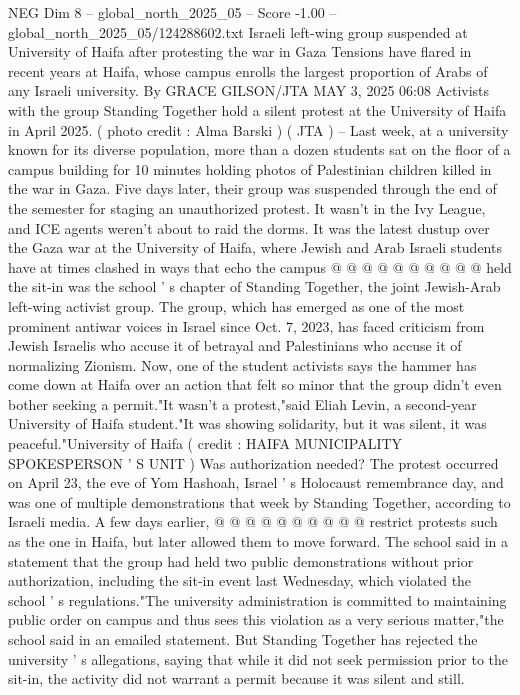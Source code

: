\begin{textsample}{NEG Dim 8 – global\_north\_2025\_05 – Score -1.00 – global\_north\_2025\_05/124288602.txt}  \label{ex:f8_neg_408}
Israeli left-wing group suspended at University of Haifa after protesting the war in Gaza Tensions have flared in recent years at Haifa, whose campus enrolls the largest proportion of Arabs of any Israeli university.
By GRACE GILSON/JTA MAY 3, 2025 06:08 Activists with the group Standing Together hold a silent protest at the University of Haifa in April 2025. ( photo credit : Alma Barski ) ( JTA ) -- Last week, at a university known for its diverse population, more than a dozen students sat on the floor of a campus building for 10 minutes holding photos of Palestinian children killed in the war in Gaza.
Five days later, their group was suspended through the end of the semester for staging an unauthorized protest.
It wasn't in the Ivy League, and ICE agents weren't about to raid the dorms.
It was the latest dustup over the Gaza war at the University of Haifa, where Jewish and Arab Israeli students have at times clashed in ways that echo the campus @ @ @ @ @ @ @ @ @ @ held the sit-in was the school ' s chapter of Standing Together, the joint Jewish-Arab left-wing activist group.
The group, which has emerged as one of the most prominent antiwar voices in Israel since Oct. 7, 2023, has faced criticism from Jewish Israelis who accuse it of betrayal and Palestinians who accuse it of normalizing Zionism.
Now, one of the student activists says the hammer has come down at Haifa over an action that felt so minor that the group didn't even bother seeking a permit."It wasn't a protest,"said Eliah Levin, a second-year University of Haifa student."It was showing solidarity, but it was silent, it was peaceful."University of Haifa ( credit : HAIFA MUNICIPALITY SPOKESPERSON ' S UNIT ) Was authorization needed?
The protest occurred on April 23, the eve of Yom Hashoah, Israel ' s Holocaust remembrance day, and was one of multiple demonstrations that week by Standing Together, according to Israeli media.
A few days earlier, @ @ @ @ @ @ @ @ @ @ restrict protests such as the one in Haifa, but later allowed them to move forward.
The school said in a statement that the group had held two public demonstrations without prior authorization, including the sit-in event last Wednesday, which violated the school ' s regulations."The university administration is committed to maintaining public order on campus and thus sees this violation as a very serious matter,"the school said in an emailed statement.
But Standing Together has rejected the university ' s allegations, saying that while it did not seek permission prior to the sit-in, the activity did not warrant a permit because it was silent and still.

\end{textsample}
